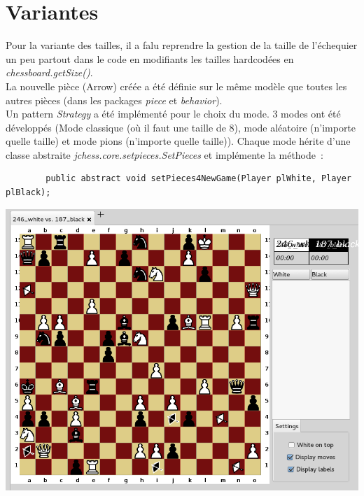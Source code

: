 \documentclass{article}
\begin{document}
	\section{Variantes}
	\label{sec:Variantes}

	Pour la variante des tailles, il a falu reprendre la gestion de la taille de l'échequier un peu partout dans le code en modifiants les tailles hardcodées en \emph{chessboard.getSize()}.\\
	La nouvelle pièce (Arrow) créée a été définie sur le même modèle que toutes les autres pièces (dans les packages \emph{piece} et \emph{behavior}).\\
	Un pattern \emph{Strategy} a été implémenté pour le choix du mode. 3 modes ont été développés (Mode classique (où il faut une taille de 8), mode aléatoire (n'importe quelle taille) et mode pions (n'importe quelle taille)). Chaque mode hérite d'une classe abstraite \emph{jchess.core.setpieces.SetPieces} et implémente la méthode~:
	\begin{verbatim}
		public abstract void setPieces4NewGame(Player plWhite, Player plBlack);
	\end{verbatim}
	\begin{center}
		\includegraphics[scale=0.5]{img/Variantes}
		\label{Variantes}
	\end{center}
\end{document}
